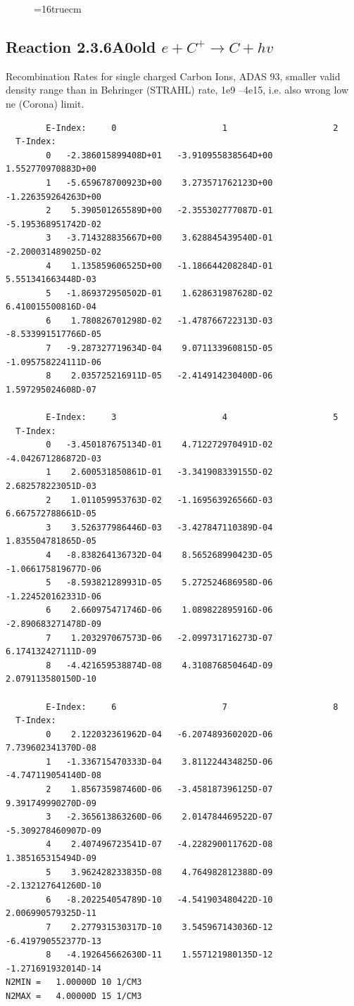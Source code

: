 \documentclass[12pt,dvipdfmx]{article}
\begin{document}
\begin{figure} \label{2.3.6A0}
\epsfxsize=16truecm
\end{figure}
\newpage


\subsection{
Reaction 2.3.6A0old  $e + C^{+} \rightarrow C + hv$
}
 Recombination Rates for single
 charged Carbon Ions, ADAS 93,
 smaller valid density range than in Behringer (STRAHL) rate, 1e9 --4e15,
 i.e. also wrong low ne (Corona) limit.

\begin{small}\begin{verbatim}
        E-Index:     0                     1                     2
  T-Index:
        0   -2.386015899408D+01   -3.910955838564D+00    1.552770970883D+00
        1   -5.659678700923D+00    3.273571762123D+00   -1.226359264263D+00
        2    5.390501265589D+00   -2.355302777087D-01   -5.195368951742D-02
        3   -3.714328835667D+00    3.628845439540D-01   -2.200031489025D-02
        4    1.135859606525D+00   -1.186644208284D-01    5.551341663448D-03
        5   -1.869372950502D-01    1.628631987628D-02    6.410015500816D-04
        6    1.780826701298D-02   -1.478766722313D-03   -8.533991517766D-05
        7   -9.287327719634D-04    9.071133960815D-05   -1.095758224111D-06
        8    2.035725216911D-05   -2.414914230400D-06    1.597295024608D-07

        E-Index:     3                     4                     5
  T-Index:
        0   -3.450187675134D-01    4.712272970491D-02   -4.042671286872D-03
        1    2.600531850861D-01   -3.341908339155D-02    2.682578223051D-03
        2    1.011059953763D-02   -1.169563926566D-03    6.667572788661D-05
        3    3.526377986446D-03   -3.427847110389D-04    1.835504781865D-05
        4   -8.838264136732D-04    8.565268990423D-05   -1.066175819677D-06
        5   -8.593821289931D-05    5.272524686958D-06   -1.224520162331D-06
        6    2.660975471746D-06    1.089822895916D-06   -2.890683271478D-09
        7    1.203297067573D-06   -2.099731716273D-07    6.174132427111D-09
        8   -4.421659538874D-08    4.310876850464D-09    2.079113580150D-10

        E-Index:     6                     7                     8
  T-Index:
        0    2.122032361962D-04   -6.207489360202D-06    7.739602341370D-08
        1   -1.336715470333D-04    3.811224434825D-06   -4.747119054140D-08
        2    1.856735987460D-06   -3.458187396125D-07    9.391749990270D-09
        3   -2.365613863260D-06    2.014784469522D-07   -5.309278460907D-09
        4    2.407496723541D-07   -4.228290011762D-08    1.385165315494D-09
        5    3.962428233835D-08    4.764982812388D-09   -2.132127641260D-10
        6   -8.202254054789D-10   -4.541903480422D-10    2.006990579325D-11
        7    2.277931530317D-10    3.545967143036D-12   -6.419790552377D-13
        8   -4.192645662630D-11    1.557121980135D-12   -1.271691932014D-14
N2MIN =   1.00000D 10 1/CM3
N2MAX =   4.00000D 15 1/CM3


\end{verbatim}
\end{small}
\end{document}
